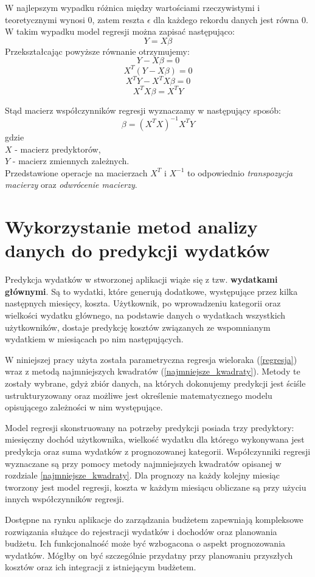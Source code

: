 W najlepszym wypadku różnica między wartościami rzeczywistymi i teoretycznymi wynosi 0, zatem reszta \(\epsilon\) dla każdego rekordu danych jest równa 0. W takim wypadku model regresji można zapisać następująco: 
\[Y = X\beta\]
Przekształcając powyższe równanie otrzymujemy:
\[Y - X\beta = 0\]
\[X^T(Y - X\beta) = 0 \]
\[X^TY - X^TX\beta = 0 \]
\[X^TX\beta = X^TY\]

Stąd macierz współczynników regresji wyznaczamy w następujący sposób:
\[\beta = (X^TX)^{-1}X^TY\]
gdzie\\
\(X\) - macierz predyktorów,\\
\(Y\) - macierz zmiennych zależnych.\cite{martinabremer2012}\\
Przedstawione operacje na macierzach \(X^T\) i \(X^{-1}\) to odpowiednio \textit{transpozycja macierzy} oraz \textit{odwrócenie macierzy}.

\section{Wykorzystanie metod analizy danych do predykcji wydatków}
Predykcja wydatków w stworzonej aplikacji wiąże się z tzw. \textbf{wydatkami głównymi}. Są to wydatki, które generują dodatkowe, występujące przez kilka następnych miesięcy, koszta. Użytkownik, po wprowadzeniu kategorii oraz wielkości wydatku głównego, na podstawie danych o wydatkach wszystkich użytkowników, dostaje predykcję kosztów związanych ze wspomnianym wydatkiem w miesiącach po nim następujących.

W niniejszej pracy użyta została parametryczna regresja wieloraka (\ref{regresja}) wraz z metodą najmniejszych kwadratów (\ref{najmniejsze_kwadraty}). Metody te zostały wybrane, gdyż zbiór danych, na których dokonujemy predykcji jest ściśle ustrukturyzowany oraz możliwe jest określenie matematycznego modelu opisującego zależności w nim występujące.

Model regresji skonstruowany na potrzeby predykcji posiada trzy predyktory: miesięczny dochód użytkownika, wielkość wydatku dla którego wykonywana jest predykcja oraz suma wydatków z prognozowanej kategorii. Współczynniki regresji wyznaczane są przy pomocy metody najmniejszych kwadratów opisanej w rozdziale \ref{najmniejsze_kwadraty}. Dla prognozy na każdy kolejny miesiąc tworzony jest model regresji, koszta w każdym miesiącu obliczane są przy użyciu innych współczynników regresji.

Dostępne na rynku aplikacje do zarządzania budżetem zapewniają kompleksowe rozwiązania służące do rejestracji wydatków i dochodów oraz planowania budżetu. Ich funkcjonalność może być wzbogacona o aspekt prognozowania wydatków. Mógłby on być szczególnie przydatny przy planowaniu przyszłych kosztów oraz ich integracji z istniejącym budżetem.